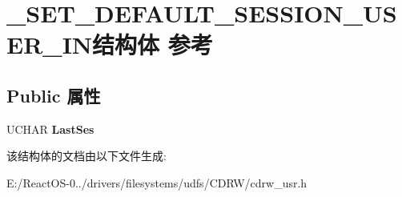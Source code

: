 \hypertarget{struct___s_e_t___d_e_f_a_u_l_t___s_e_s_s_i_o_n___u_s_e_r___i_n}{}\section{\+\_\+\+S\+E\+T\+\_\+\+D\+E\+F\+A\+U\+L\+T\+\_\+\+S\+E\+S\+S\+I\+O\+N\+\_\+\+U\+S\+E\+R\+\_\+\+I\+N结构体 参考}
\label{struct___s_e_t___d_e_f_a_u_l_t___s_e_s_s_i_o_n___u_s_e_r___i_n}
\subsection*{Public 属性}
\begin{DoxyCompactItemize}
\item 
\mbox{\label{struct___s_e_t___d_e_f_a_u_l_t___s_e_s_s_i_o_n___u_s_e_r___i_n_a8a698163a2382dac15fc38208230f73f}} 
U\+C\+H\+AR {\bfseries Last\+Ses}
\end{DoxyCompactItemize}


该结构体的文档由以下文件生成\+:\begin{DoxyCompactItemize}
\item 
E\+:/\+React\+O\+S-\/0../drivers/filesystems/udfs/\+C\+D\+R\+W/cdrw\+\_\+usr.\+h\end{DoxyCompactItemize}
